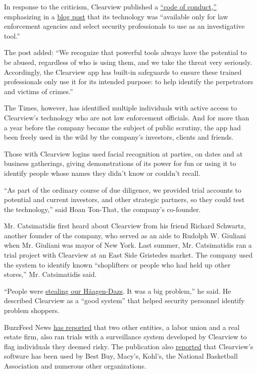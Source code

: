 In response to the criticism, Clearview published a
\href{https://blog.clearview.ai/code_of_conduct.pdf}{``code of
conduct,''} emphasizing in a
\href{https://blog.clearview.ai/post/2020-01-27-code-of-conduct/}{blog
post} that its technology was ``available only for law enforcement
agencies and select security professionals to use as an investigative
tool.''

The post added: ``We recognize that powerful tools always have the
potential to be abused, regardless of who is using them, and we take the
threat very seriously. Accordingly, the Clearview app has built-in
safeguards to ensure these trained professionals only use it for its
intended purpose: to help identify the perpetrators and victims of
crimes.''

The Times, however, has identified multiple individuals with active
access to Clearview's technology who are not law enforcement officials.
And for more than a year before the company became the subject of public
scrutiny, the app had been freely used in the wild by the company's
investors, clients and friends.

Those with Clearview logins used facial recognition at parties, on dates
and at business gatherings, giving demonstrations of its power for fun
or using it to identify people whose names they didn't know or couldn't
recall.

``As part of the ordinary course of due diligence, we provided trial
accounts to potential and current investors, and other strategic
partners, so they could test the technology,'' said Hoan Ton-That, the
company's co-founder.

Mr. Catsimatidis first heard about Clearview from his friend Richard
Schwartz, another founder of the company, who served as an aide to
Rudolph W. Giuliani when Mr. Giuliani was mayor of New York. Last
summer, Mr. Catsimatidis ran a trial project with Clearview at an East
Side Gristedes market. The company used the system to identify known
``shoplifters or people who had held up other stores,'' Mr. Catsimatidis
said.

``People were
\href{https://nypost.com/2016/08/12/ice-cream-bandits-are-wreaking-havoc-on-nyc-supermarkets/}{stealing
our Häagen-Dazs}. It was a big problem,'' he said. He described
Clearview as a ``good system'' that helped security personnel identify
problem shoppers.

BuzzFeed News
\href{https://www.buzzfeednews.com/article/carolinehaskins1/clearview-facial-recognition-insight-camera-glasses}{has
reported} that two other entities, a labor union and a real estate firm,
also ran trials with a surveillance system developed by Clearview to
flag individuals they deemed risky. The publication also
\href{https://www.buzzfeednews.com/article/ryanmac/clearview-ai-fbi-ice-global-law-enforcement}{reported}
that Clearview's software has been used by Best Buy, Macy's, Kohl's, the
National Basketball Association and numerous other organizations.

